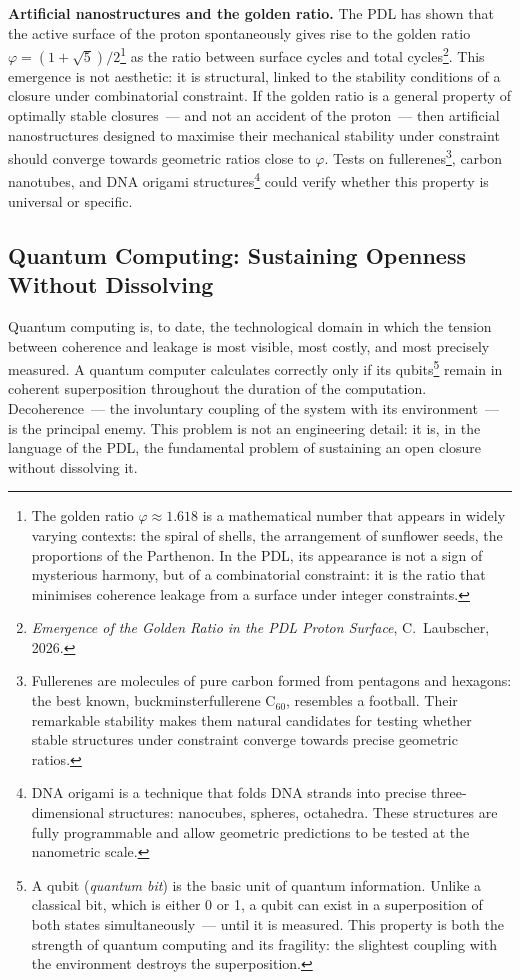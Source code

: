 \documentclass[12pt, a4paper, openright]{book}
\begin{document}
\textbf{Artificial nanostructures and the golden ratio.} The PDL has shown that the active surface of the proton spontaneously gives rise to the golden ratio $\varphi = (1+\sqrt{5})/2$\footnote{The golden ratio $\varphi \approx 1.618$ is a mathematical number that appears in widely varying contexts: the spiral of shells, the arrangement of sunflower seeds, the proportions of the Parthenon. In the PDL, its appearance is not a sign of mysterious harmony, but of a combinatorial constraint: it is the ratio that minimises coherence leakage from a surface under integer constraints.} as the ratio between surface cycles and total cycles\footnote{\textit{Emergence of the Golden Ratio in the PDL Proton Surface}, C.~Laubscher, 2026.}. This emergence is not aesthetic: it is structural, linked to the stability conditions of a closure under combinatorial constraint. If the golden ratio is a general property of optimally stable closures~--- and not an accident of the proton~--- then artificial nanostructures designed to maximise their mechanical stability under constraint should converge towards geometric ratios close to $\varphi$. Tests on fullerenes\footnote{Fullerenes are molecules of pure carbon formed from pentagons and hexagons: the best known, buckminsterfullerene C$_{60}$, resembles a football. Their remarkable stability makes them natural candidates for testing whether stable structures under constraint converge towards precise geometric ratios.}, carbon nanotubes, and DNA origami structures\footnote{DNA origami is a technique that folds DNA strands into precise three-dimensional structures: nanocubes, spheres, octahedra. These structures are fully programmable and allow geometric predictions to be tested at the nanometric scale.} could verify whether this property is universal or specific.

\subsection*{Quantum Computing: Sustaining Openness Without Dissolving}

Quantum computing is, to date, the technological domain in which the tension between coherence and leakage is most visible, most costly, and most precisely measured. A quantum computer calculates correctly only if its qubits\footnote{A qubit (\textit{quantum bit}) is the basic unit of quantum information. Unlike a classical bit, which is either 0 or 1, a qubit can exist in a superposition of both states simultaneously~--- until it is measured. This property is both the strength of quantum computing and its fragility: the slightest coupling with the environment destroys the superposition.} remain in coherent superposition throughout the duration of the computation. Decoherence~--- the involuntary coupling of the system with its environment~--- is the principal enemy. This problem is not an engineering detail: it is, in the language of the PDL, the fundamental problem of sustaining an open closure without dissolving it.
\end{document}

